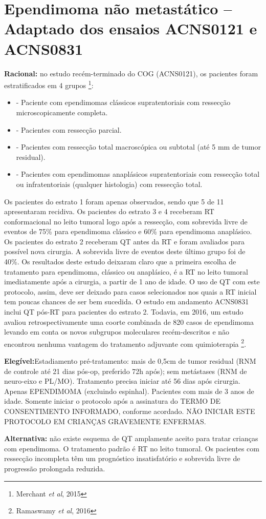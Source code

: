 \documentclass[11pt,a4paper,oldfontcommands]{memoir}
\begin{document}
\section{Ependimoma não metastático -- Adaptado dos ensaios ACNS0121 e ACNS0831}
{\let\thefootnote\relax{}}
\small{
\textbf{Racional:} no estudo recém-terminado do COG (ACNS0121), os pacientes foram estratificados em 4 grupos \footnote{Merchant \textit{et al}, 2015}:
\begin{itemize}
\item[Estrato 1] - Paciente com ependimomas clássicos supratentoriais com ressecção microscopicamente completa.
\item[Estrato 2] - Pacientes com ressecção parcial.
\item[Estrato 3] - Pacientes com ressecção total macroscópica ou subtotal (até 5 mm de tumor residual).
\item[Estrato 4] - Pacientes com ependimomas anaplásicos supratentoriais com ressecção total ou infratentoriais (qualquer histologia) com ressecção total.
\end{itemize}

Os pacientes do estrato 1 foram apenas observados, sendo que 5 de 11 apresentaram recidiva. Os pacientes do estrato 3 e 4 receberam RT conformacional no leito tumoral logo após a ressecção, com sobrevida livre de eventos de 75\% para ependimoma clássico e 60\% para ependimoma anaplásico. Os pacientes do estrato 2 receberam QT antes da RT e foram avaliados para possível nova cirurgia. A sobrevida livre de eventos deste último grupo foi de 40\%. Os resultados deste estudo deixaram claro que a primeira escolha de tratamento para ependimoma, clássico ou anaplásico, é a RT no leito tumoral imediatamente após a cirurgia, a partir de 1 ano de idade. O uso de QT com este protocolo, assim, deve ser deixado para casos selecionados nos quais a RT inicial tem poucas chances de ser bem sucedida. O estudo em andamento ACNS0831 inclui QT pós-RT para pacientes do estrato 2. Todavia, em 2016, um estudo avaliou retrospectivamente uma coorte combinada de 820 casos de ependimoma levando em conta os novos subgrupos moleculares recém-descritos e não encontrou nenhuma vantagem do tratamento adjuvante com quimioterapia \footnote{Ramaswamy \textit{et al}, 2016}.

\textbf{Elegível:}Estadiamento pré-tratamento: mais de 0,5cm de tumor residual (RNM de controle até 21 dias pós-op, preferido 72h após); sem metástases (RNM de neuro-eixo e PL/MO). Tratamento precisa iniciar até 56 dias após cirurgia. Apenas EPENDIMOMA (excluindo espinhal). Pacientes com mais de 3 anos de idade. Somente iniciar o protocolo após a assinatura do TERMO DE CONSENTIMENTO INFORMADO, conforme acordado. NÃO INICIAR ESTE PROTOCOLO EM CRIANÇAS GRAVEMENTE ENFERMAS.

\textbf{Alternativa:} não existe esquema de QT amplamente aceito para tratar crianças com ependimoma. O tratamento padrão é RT no leito tumoral. Os pacientes com ressecção incompleta têm um prognóstico insatisfatório e sobrevida livre de progressão prolongada reduzida.}
\end{document}
